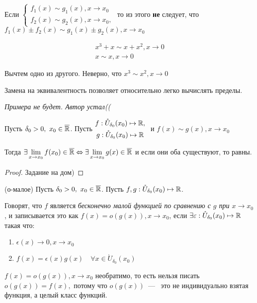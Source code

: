 \begin{note}
    Если $\left\{
    \begin{gathered}
        f_{1}(x) \sim g_{1}(x), x\to x_{0} \\
        f_{2}(x) \sim g_{2}(x), x\to x_{0},
    \end{gathered} \right.$ то из этого \textbf{не} следует, что $f_{1}(x) \pm f_{2} (x) \sim g_{1}(x) \pm g_{2} (x), x\to x_{0}$
\end{note}

\begin{counterexample}
    $$\begin{gathered}
        x^{3} + x \sim x + x^{2}, x \to 0 \\
        x \sim x, x \to 0
    \end{gathered}$$

    Вычтем одно из другого. Неверно, что  $x^{3}\sim x^{2}, x\to 0$      
\end{counterexample}

Замена на эквивалентность позволяет относительно легко вычислять пределы.

\textit{Примера не будет. Автор устал((}

\begin{lemma}
    Пусть $\delta_{0} > 0, \ x_{0} \in \overline{\mathbb{R}}$. Пусть $ \begin{gathered}
        f: \mathring{U}_{\delta_{0}}(x_{0}) \mapsto \mathbb{R}, \\
        g:\mathring{U}_{\delta_{0}}(x_{0}) \mapsto \mathbb{R}
    \end{gathered}\ $ и $f(x) \sim g(x), x\to x_{0}$ 

    Тогда $\exists \lim\limits_{x\to x_{0}} f(x_{0}) \in \overline{\mathbb{R}} \Leftrightarrow \exists \lim\limits_{x\to x_{0}} g(x)\in \overline{\mathbb{R}}$ и если они оба существуют, то равны.
\end{lemma}
\begin{proof}
    Задание на дом)
\end{proof}

\begin{definition}
    (о-малое) Пусть $\delta_{0} > 0, \ x_{0} \in \overline{\mathbb{R}}$. Пусть $f, g: \mathring{U}_{\delta_{0}}(x_{0}) \mapsto \mathbb{R}$.

    Говорят, что $f$ является \textit{бесконечно малой функцией по сравнению с $g$ при $x \to x_{0}$}, и записывается это как $f(x) = o(g(x)), x \to x_{0}$, если $\exists \varepsilon: \mathring{U}_{\delta_{0}}(x_{0}) \mapsto \mathbb{R}$ такая что:
    \begin{enumerate}
        \item $\epsilon(x) \to 0, x\to x_{0}$
        \item $f(x) = \epsilon(x)g(x) \quad \forall x \in \mathring{U}_{\delta_{0}}(x_{0})$
    \end{enumerate}
\end{definition}
\begin{note} 
    $f(x) = o(g(x)), x \to x_{0}$ необратимо, то есть нельзя писать $o(g(x)) = f(x),$ потому что $o(g(x))$~---~ это не индивидуально взятая функция, а целый класс функций. 
\end{note}

